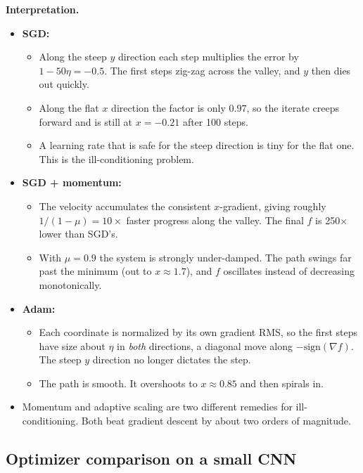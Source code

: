 \documentclass[11pt,a4paper]{article}
\begin{document}
\textbf{Interpretation.}
\begin{itemize}
  \item \textbf{SGD:}
  \begin{itemize}
    \item Along the steep $y$ direction each step multiplies the error by $1-50\eta=-0.5$. The first steps zig-zag across the valley, and $y$ then dies out quickly.
    \item Along the flat $x$ direction the factor is only $0.97$, so the iterate creeps forward and is still at $x=-0.21$ after 100 steps.
    \item A learning rate that is safe for the steep direction is tiny for the flat one. This is the ill-conditioning problem.
  \end{itemize}
  \item \textbf{SGD + momentum:}
  \begin{itemize}
    \item The velocity accumulates the consistent $x$-gradient, giving roughly $1/(1-\mu)=10\times$ faster progress along the valley. The final $f$ is 250$\times$ lower than SGD's.
    \item With $\mu=0.9$ the system is strongly under-damped. The path swings far past the minimum (out to $x\approx1.7$), and $f$ oscillates instead of decreasing monotonically.
  \end{itemize}
  \item \textbf{Adam:}
  \begin{itemize}
    \item Each coordinate is normalized by its own gradient RMS, so the first steps have size about $\eta$ in \emph{both} directions, a diagonal move along $-\mathrm{sign}(\nabla f)$. The steep $y$ direction no longer dictates the step.
    \item The path is smooth. It overshoots to $x\approx0.85$ and then spirals in.
  \end{itemize}
  \item Momentum and adaptive scaling are two different remedies for ill-conditioning. Both beat gradient descent by about two orders of magnitude.
\end{itemize}

\subsection{Optimizer comparison on a small CNN}
\end{document}
